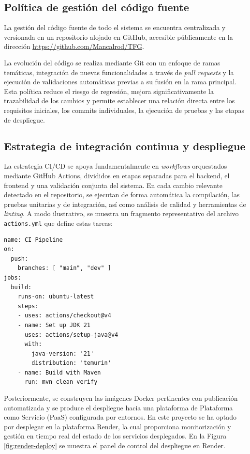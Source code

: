 \subsection{Pol\'itica de gesti\'on del c\'odigo fuente}

La gesti\'on del c\'odigo fuente de todo el sistema se encuentra centralizada y versionada en un repositorio alojado en GitHub, accesible p\'ublicamente en la direcci\'on \url{https://github.com/Mancalrod/TFG}. 

La evoluci\'on del c\'odigo se realiza mediante Git con un enfoque de ramas tem\'aticas, integraci\'on de nuevas funcionalidades a trav\'es de \emph{pull requests} y la ejecuci\'on de validaciones autom\'aticas previas a su fusi\'on en la rama principal. Esta pol\'itica reduce el riesgo de regresi\'on, mejora significativamente la trazabilidad de los cambios y permite establecer una relaci\'on directa entre los requisitos iniciales, los commits individuales, la ejecuci\'on de pruebas y las etapas de despliegue.

\subsection{Estrategia de integraci\'on continua y despliegue}

La estrategia CI/CD se apoya fundamentalmente en \emph{workflows} orquestados mediante GitHub Actions, divididos en etapas separadas para el backend, el frontend y una validaci\'on conjunta del sistema. En cada cambio relevante detectado en el repositorio, se ejecutan de forma autom\'atica la compilaci\'on, las pruebas unitarias y de integraci\'on, as\'i como an\'alisis de calidad y herramientas de \emph{linting}. A modo ilustrativo, se muestra un fragmento representativo del archivo \texttt{actions.yml} que define estas tareas:

\begin{verbatim}
name: CI Pipeline
on:
  push:
    branches: [ "main", "dev" ]
jobs:
  build:
    runs-on: ubuntu-latest
    steps:
    - uses: actions/checkout@v4
    - name: Set up JDK 21
      uses: actions/setup-java@v4
      with:
        java-version: '21'
        distribution: 'temurin'
    - name: Build with Maven
      run: mvn clean verify
\end{verbatim}

Posteriormente, se construyen las im\'agenes Docker pertinentes con publicaci\'on automatizada y se produce el despliegue hacia una plataforma de Plataforma como Servicio (PaaS) configurada por entornos. En este proyecto se ha optado por desplegar en la plataforma Render, la cual proporciona monitorizaci\'on y gesti\'on en tiempo real del estado de los servicios desplegados. En la Figura \ref{fig:render-deploy} se muestra el panel de control del despliegue en Render.

